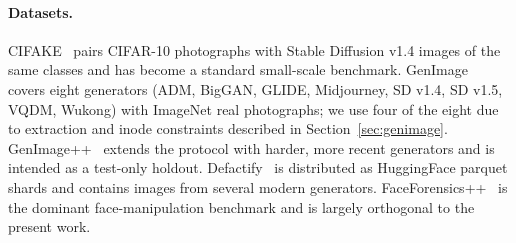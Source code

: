 \paragraph{Datasets.}
CIFAKE~\cite{cifake} pairs CIFAR-10 photographs with Stable Diffusion v1.4 images of the same classes and has become a standard small-scale benchmark. GenImage~\cite{genimage} covers eight generators (ADM, BigGAN, GLIDE, Midjourney, SD v1.4, SD v1.5, VQDM, Wukong) with ImageNet real photographs; we use four of the eight due to extraction and inode constraints described in Section~\ref{sec:genimage}. GenImage++~\cite{genimagepp} extends the protocol with harder, more recent generators and is intended as a test-only holdout. Defactify~\cite{defactify} is distributed as HuggingFace parquet shards and contains images from several modern generators. FaceForensics++~\cite{ffpp} is the dominant face-manipulation benchmark and is largely orthogonal to the present work.
